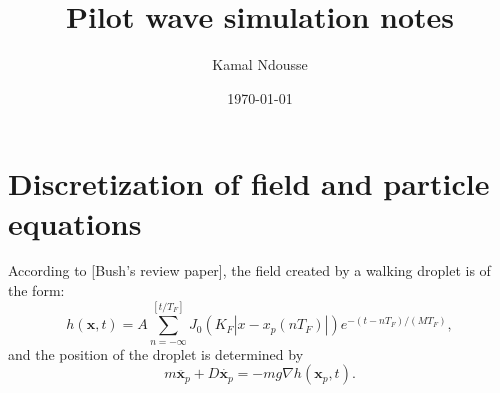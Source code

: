 \documentclass{article}
\newcommand{\x}{\mathbf{x}}
\begin{document}
\title{Pilot wave simulation notes}
\author{Kamal Ndousse}
\date{\today}

\maketitle

\section{Discretization of field and particle equations}

According to [Bush's review paper], the field created by a walking droplet is of the form:
\begin{equation}
	\label{eq:raw_field}
	h(\x,t) = A \sum_{n = -\infty}^{\left[ t/T_{F} \right]} J_{0} \left( K_{F} \left| x - x_{p}(n T_{F}) \right| \right) e^{-(t - n T_{F})/(M T_{F})},
\end{equation}
and the position of the droplet is determined by
\begin{equation}
	\label{eq:raw_droplet}
	m \ddot{\x_p} + D \dot{\mathbf{x}_{p}} = - m g \nabla h(\x_p,t).
\end{equation}
\end{document}
